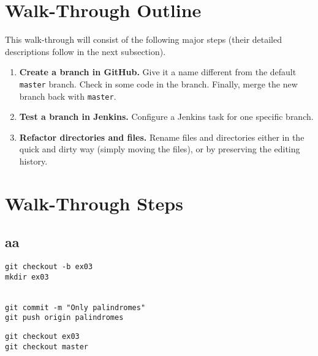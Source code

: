 \documentclass[11pt,a4paper]{article}
\begin{document}
\section{Walk-Through Outline}

This walk-through will consist of the following major steps (their detailed descriptions
follow in the next subsection).

\begin{enumerate}
\item {\bf Create a branch in GitHub.} Give it a name different from the default {\tt master} branch. 
Check in some code in the branch. Finally, merge the new branch back with {\tt master}.
\item {\bf Test a branch in Jenkins.} Configure a Jenkins task for one specific branch. 
\item {\bf Refactor directories and files.} Rename files and directories either in the quick and dirty way 
(simply moving the files), or by preserving the editing history.
\end{enumerate}


\section{Walk-Through Steps}

\subsection{aa}

\begin{Verbatim}
git checkout -b ex03
mkdir ex03


git commit -m "Only palindromes"
git push origin palindromes 
\end{Verbatim}

\begin{Verbatim}
git checkout ex03
git checkout master
\end{Verbatim}

\end{document}

